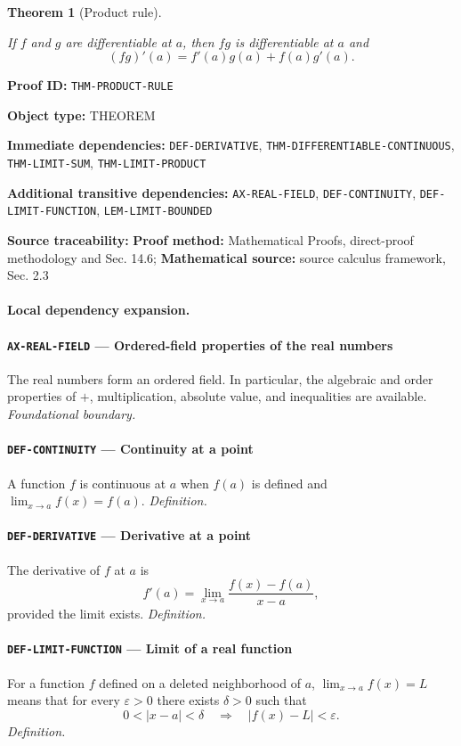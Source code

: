 \documentclass[10pt]{article}
\newcommand{\pidraw}[1]{\begingroup\urlstyle{tt}\nolinkurl{#1}\endgroup}
\newtheorem{theorem}{Theorem}[section]
\theoremstyle{definition}
\theoremstyle{remark}
\newcommand{\meta}[2]{\noindent\textbf{#1:} #2\par}
\begin{document}
\begin{theorem}[Product rule]\label{prf:THM-PRODUCT-RULE}

If $f$ and $g$ are differentiable at $a$, then $fg$ is differentiable at $a$ and
\[
(fg)'(a)=f'(a)g(a)+f(a)g'(a).
\]

\end{theorem}

\meta{Proof ID}{\pidraw{THM-PRODUCT-RULE}}
\meta{Object type}{THEOREM}
\meta{Immediate dependencies}{\pidraw{DEF-DERIVATIVE}, \pidraw{THM-DIFFERENTIABLE-CONTINUOUS}, \pidraw{THM-LIMIT-SUM}, \pidraw{THM-LIMIT-PRODUCT}}
\meta{Additional transitive dependencies}{\pidraw{AX-REAL-FIELD}, \pidraw{DEF-CONTINUITY}, \pidraw{DEF-LIMIT-FUNCTION}, \pidraw{LEM-LIMIT-BOUNDED}}
\meta{Source traceability}{\textbf{Proof method:} Mathematical Proofs, direct-proof methodology and Sec. 14.6; \textbf{Mathematical source:} source calculus framework, Sec. 2.3}

\paragraph{Local dependency expansion.}

\paragraph{\pidraw{AX-REAL-FIELD} --- Ordered-field properties of the real numbers}
The real numbers form an ordered field. In particular, the algebraic and order properties of $+$, multiplication, absolute value, and inequalities are available.
\textit{Foundational boundary.}

\paragraph{\pidraw{DEF-CONTINUITY} --- Continuity at a point}
A function $f$ is continuous at $a$ when $f(a)$ is defined and $\lim_{x\to a}f(x)=f(a)$.
\textit{Definition.}

\paragraph{\pidraw{DEF-DERIVATIVE} --- Derivative at a point}
The derivative of $f$ at $a$ is
\[
f'(a)=\lim_{x\to a}\frac{f(x)-f(a)}{x-a},
\]
provided the limit exists.
\textit{Definition.}

\paragraph{\pidraw{DEF-LIMIT-FUNCTION} --- Limit of a real function}
For a function $f$ defined on a deleted neighborhood of $a$, $\lim_{x\to a}f(x)=L$ means that for every $\varepsilon>0$ there exists $\delta>0$ such that
\[
0<|x-a|<\delta\quad\Longrightarrow\quad |f(x)-L|<\varepsilon.
\]
\textit{Definition.}
\end{document}

